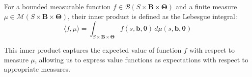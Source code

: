 \begin{definition}
    For a bounded measurable function $f \in \mathcal{B}(S \times \boldsymbol{B}\times
        \boldsymbol{\Theta})$ and a finite measure $\mu \in \mathcal{M}(S \times \boldsymbol
        {B}\times \boldsymbol{\Theta})$, their inner product is defined as the
    Lebesgue integral:
    \begin{equation}
        \langle f, \mu \rangle = \int_{S \times \boldsymbol{B} \times \boldsymbol{\Theta}}
        f(s, \boldsymbol{b}, \boldsymbol{\theta}) \, d\mu(s, \boldsymbol{b}, \boldsymbol
        {\theta})
    \end{equation}
\end{definition}

This inner product captures the expected value of function $f$ with respect to
measure $\mu$, allowing us to express value functions as expectations with respect
to appropriate measures.

